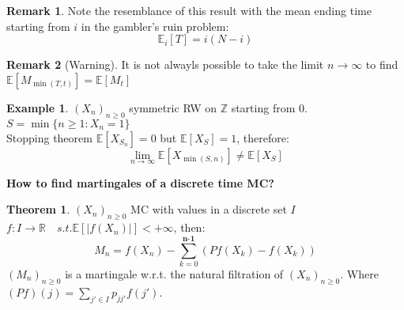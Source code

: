 \documentclass[10pt,a4paper]{article}
\theoremstyle{definition}
\newtheorem{exi}{Example}[section]
\newtheorem{teo}{Theorem}[section]
\newtheorem*{rem}{Remark}
\begin{document}
\begin{rem}
	Note the resemblance of this result with the mean ending time starting from $i$ in the gambler's ruin problem:
	\begin{equation*}                                               
		\mathbb{E}_i[T]=i(N-i)
	\end{equation*}
\end{rem}
\begin{rem}[Warning]
	It is not alwayls possible to take the limit $n\to\infty$ to find $ \mathbb{E}[M_{\min{(T,t)}}]=\mathbb{E}[M_{t}] $
\end{rem}
\begin{exi}
	$(X_n)_{n\geq0}$ symmetric RW on $\mathbb{Z}$ starting from $0$.\\
	$S=\min{\{n\geq1: X_n=1\}}$ \\
	Stopping theorem $\mathbb{E}[X_{S_n}]=0 $ but $\mathbb{E}[X_{S}]=1 $, therefore:
	\begin{equation*}
		\lim_{n\to\infty}\mathbb{E}[X_{\min{(S,n)}}]\neq\mathbb{E}[X_{S}]
	\end{equation*}
\end{exi}
\textbf{How to find martingales of a discrete time MC?}
\begin{teo}
	$(X_n)_{n\geq0}$ MC with values in a discrete set $I$\\
	$f:I\to\mathbb{R}\quad s.t. \mathbb{E}[|f(X_n)|]<+\infty$, then:
	\begin{equation*}
		M_n=f(X_n)-\sum_{k=0}^{\textbf{n-1}}(Pf(X_k)-f(X_k))
	\end{equation*}
$(M_n)_{n\geq0}$ is a martingale w.r.t. the natural filtration of $(X_n)_{n\geq0}$.
Where $(Pf)(j)=\sum_{j'\in I}p_{jj'}f(j')$.
\end{teo}
\end{document}
